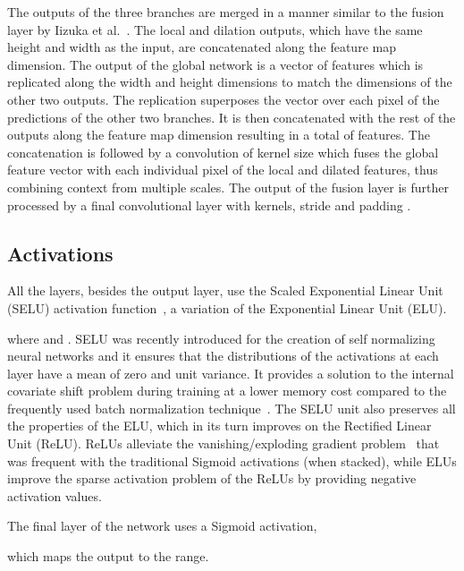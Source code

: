 \documentclass{egpubl}
\begin{document}
The outputs of the three branches are merged in a manner similar to the fusion
layer by Iizuka et al.~\cite{iizuka2016colornet}. The local and dilation outputs, which have
the same height and width as the input, are concatenated along the feature map
dimension. The output of the global network is a vector of  features which
is replicated along the width and height dimensions to match the dimensions of
the other two outputs. The replication superposes the vector over each pixel of
the predictions of the other two branches. It is then concatenated with the
rest of the outputs along the feature map dimension resulting in a total of
 features. The concatenation is followed by a convolution of kernel size
 which fuses the global feature vector with each individual pixel of
the local and dilated features, thus combining context from multiple scales.
The output of the fusion layer is further processed by a final convolutional
layer with  kernels, stride  and padding .

\subsection{\textbf{Activations}}

All the layers, besides the output layer, use the Scaled Exponential Linear
Unit (SELU) activation function~\cite{klambauer2017selu}, a variation of the
Exponential Linear Unit (ELU).

where  and . SELU was recently introduced for the creation of self normalizing neural networks and it
ensures that the distributions of the activations at each layer have a mean of zero and unit variance. It provides a solution to the internal
covariate shift problem during training at a lower memory cost compared to the frequently used batch normalization
technique~\cite{ioffe2015batchnorm}. The SELU unit also preserves all the properties of the ELU, which in its turn improves on the Rectified Linear
Unit (ReLU). ReLUs alleviate the vanishing/exploding gradient problem~\cite{krizhevsky2017alexnet} that was frequent with the traditional Sigmoid
activations (when stacked), while ELUs improve the sparse activation problem of the ReLUs by providing negative activation values.

The final layer of the network uses a Sigmoid activation,

which maps the output to the  range.
\end{document}

